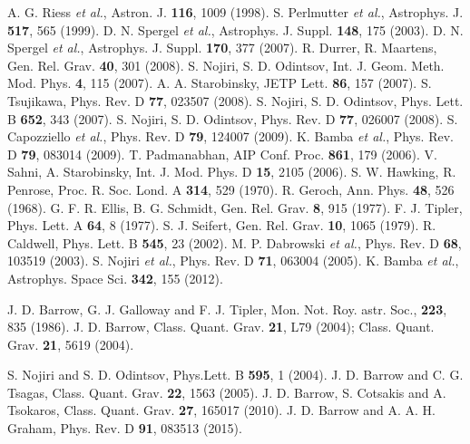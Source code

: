 \documentclass[11pt]{article}
\theoremstyle{theorem}
\theoremstyle{defi}
\begin{document}
\begin{thebibliography}{99}
 A. G. Riess \emph{et al.}, Astron. J. \textbf{116}, 1009 (1998).
 S. Perlmutter \emph{et al.}, Astrophys. J. \textbf{517}, 565 (1999).
 D. N. Spergel \emph{et al.}, Astrophys. J. Suppl. \textbf{148}, 175 (2003).
 D. N. Spergel \emph{et al.}, Astrophys. J. Suppl. \textbf{170}, 377 (2007).
 R. Durrer, R. Maartens, Gen. Rel. Grav. \textbf{40}, 301 (2008).
 S. Nojiri, S. D. Odintsov, Int. J. Geom. Meth. Mod. Phys. \textbf{4}, 115 (2007).
 A. A. Starobinsky, JETP Lett. \textbf{86}, 157 (2007).
 S. Tsujikawa, Phys. Rev. D \textbf{77}, 023507 (2008).
 S. Nojiri, S. D. Odintsov, Phys. Lett. B \textbf{652}, 343 (2007).
 S. Nojiri, S. D. Odintsov, Phys. Rev. D \textbf{77}, 026007 (2008).
 S. Capozziello \emph{et al.}, Phys. Rev. D \textbf{79}, 124007 (2009).
 K. Bamba \emph{et al.}, Phys. Rev. D \textbf{79}, 083014 (2009).
 T. Padmanabhan, AIP Conf. Proc. \textbf{861}, 179 (2006).
 V. Sahni, A. Starobinsky, Int. J. Mod. Phys. D \textbf{15}, 2105 (2006).
 S. W. Hawking, R. Penrose, Proc. R. Soc. Lond. A \textbf{314}, 529 (1970).
 R. Geroch, Ann. Phys. \textbf{48}, 526 (1968).
 G. F. R. Ellis, B. G. Schmidt, Gen. Rel. Grav. \textbf{8}, 915 (1977).
 F. J. Tipler, Phys. Lett. A \textbf{64}, 8 (1977).
 S. J. Seifert, Gen. Rel. Grav. \textbf{10}, 1065 (1979).
 R. Caldwell, Phys. Lett. B \textbf{545}, 23 (2002).
 M. P. Dabrowski \emph{et al.}, Phys. Rev. D \textbf{68}, 103519 (2003).
 S. Nojiri \emph{et al.}, Phys. Rev. D \textbf{71}, 063004 (2005).
 K. Bamba \emph{et al.}, Astrophys. Space Sci. \textbf{342}, 155 (2012).

 J. D. Barrow, G. J. Galloway and F. J. Tipler, Mon. Not. Roy. astr. Soc., \textbf{223}, 835 (1986).
 J. D. Barrow, Class. Quant. Grav. \textbf{21}, L79 (2004); Class. Quant. Grav. \textbf{21}, 5619 (2004).

 S. Nojiri and S. D. Odintsov, Phys.Lett. B \textbf{595}, 1 (2004).
 J. D. Barrow and C. G. Tsagas, Class. Quant. Grav. \textbf{22}, 1563 (2005).
  J. D. Barrow, S. Cotsakis and A. Tsokaros, Class. Quant. Grav. \textbf{27}, 165017 (2010).
 J. D. Barrow and A. A. H. Graham, Phys. Rev. D \textbf{91}, 083513 (2015).


\end{thebibliography}
\end{document}
